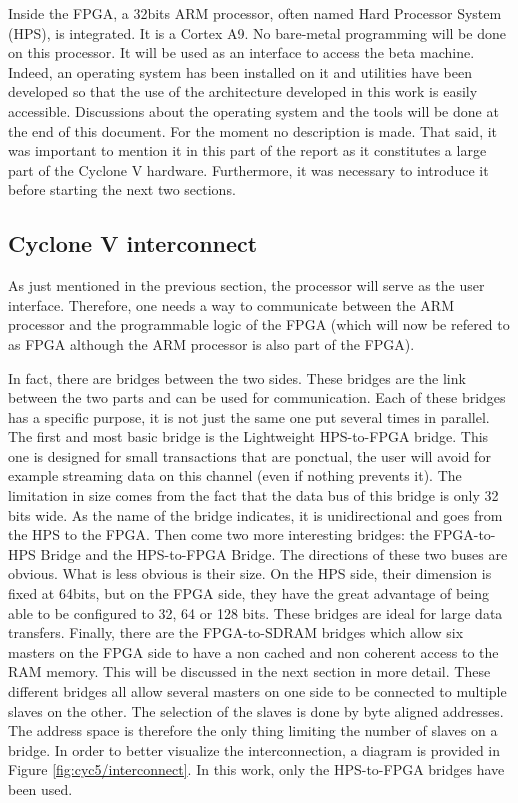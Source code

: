 Inside the FPGA, a 32bits ARM processor, often named Hard Processor System (HPS), is integrated. It is a Cortex A9. No bare-metal programming 
will be done on this processor. It will be used as an interface to access the beta machine. Indeed, 
an operating system has been installed on it and utilities have been developed so that the use of 
the architecture developed in this work is easily accessible. Discussions about the operating system 
and the tools will be done at the end of this document. For the moment no description is made. That 
said, it was important to mention it in this part of the report as it constitutes a large part of 
the Cyclone V hardware. Furthermore, it was necessary to introduce it before starting the next two 
sections.

\subsection{Cyclone V interconnect}

As just mentioned in the previous section, the processor will serve as the user interface. 
Therefore, one needs a way to communicate between the ARM processor and the programmable logic of the 
FPGA (which will now be refered to as FPGA although the ARM processor is also part of the FPGA). 

In fact, there are bridges between the two sides. These bridges are the link between the two parts 
and can be used for communication. Each of these bridges has a specific purpose, it is not just the 
same one put several times in parallel. The first and most basic bridge is the Lightweight HPS-to-FPGA 
bridge. This one is designed for small transactions that are ponctual, the user will avoid for example 
streaming data on this channel (even if nothing prevents it). The limitation in size comes from the 
fact that the data bus of this bridge is only 32 bits wide. As the name of the bridge indicates, it 
is unidirectional and goes from the HPS to the FPGA. Then come two more interesting bridges: the 
FPGA-to-HPS Bridge and the HPS-to-FPGA Bridge. The directions of these two buses are obvious. What 
is less obvious is their size. On the HPS side, their dimension is fixed at 64bits, but on the FPGA 
side, they have the great advantage of being able to be configured to 32, 64 or 128 bits. 
These bridges are ideal for large data transfers. Finally, there are the FPGA-to-SDRAM bridges which 
allow six masters on the FPGA side to have a non cached and non coherent access to the RAM memory. 
This will be discussed in the next section in more detail. These different bridges all allow several
masters on one side to be connected to multiple slaves on the other. The selection of the 
slaves is done by byte aligned addresses. The address space is therefore the only thing limiting the 
number of slaves on a bridge. In order to better visualize the interconnection, a diagram is provided 
in Figure \ref{fig:cyc5/interconnect}. In this work, only the HPS-to-FPGA bridges have been used. 

